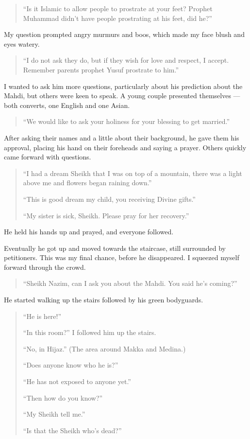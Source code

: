 \documentclass[12pt]{memoir}
\newcommand{\cor}[2]{#2} %
\begin{document}
\begin{quote}
“Is it Islamic to allow people to prostrate at your feet?
Prophet Muhammad didn’t have people prostrating at his feet, did he?”
\end{quote}

My question prompted angry murmurs and boos,
which made my face blush and eyes \cor{water}{watery}.

\begin{quote}
“I do not ask they do, but if they wish for love and respect, I accept.
Remember parents prophet Yusuf prostrate to him.”
\end{quote}

I wanted to ask him more questions,
particularly about his prediction about the Mahdi,
but others were keen to speak.
A young couple presented themselves —
both converts, one English and one Asian.

\begin{quote}
“We would like to ask your holiness for your blessing to get married.”
\end{quote}

After asking their names and a little about their background,
he gave them his approval,
placing his hand on their foreheads and saying a prayer.
Others quickly came forward with questions.

\begin{quote}
“I had a dream Sheikh that I was on top of a mountain,
there was a light above me and flowers began raining down.”

“This is good dream my child, you receiving Divine gifts.”

“My sister is sick, Sheikh. Please pray for her recovery.”
\end{quote}

He held his hands up and prayed, and everyone followed.

Eventually he got up and moved towards the staircase,
still surrounded by petitioners.
This was my final chance, before he disappeared.
I squeezed myself forward through the crowd.

\begin{quote}
“Sheikh Nazim, can I ask you about the Mahdi. You said he’s coming?”
\end{quote}

He started walking up the stairs followed by his green bodyguards.

\begin{quote}
“He is here!”

“In this room?” I followed him up the stairs.

“No, in Hijaz.” (The area around Makka and Medina.)

“Does anyone know who he is?”

“He has not exposed to anyone yet.”

“Then how do you know?”

“My Sheikh tell me.”

“Is that the Sheikh who’s dead?”
\end{quote}
\end{document}

